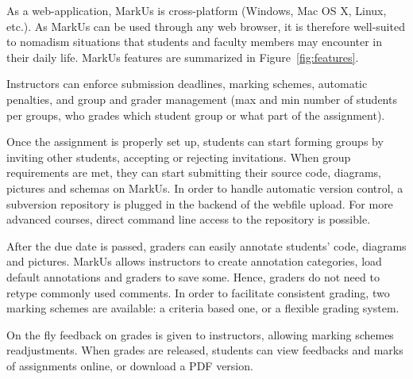 \documentclass[twocolumn,10pt]{asme2e}
\begin{document}
As a web-application, MarkUs is cross-platform (Windows, Mac OS X, Linux,
etc.). As MarkUs can be used through any web browser, it is therefore
well-suited to nomadism situations that students and faculty members may
encounter in their daily life. MarkUs features are summarized in Figure~\ref{fig:features}.

Instructors can enforce submission deadlines, marking schemes, automatic
penalties, and group and grader management (max and min number of students per
groups, who grades which student group or what part of the assignment).

Once the assignment is properly set up, students can start forming groups by
inviting other students, accepting or rejecting invitations. When group
requirements are met, they can start submitting their source code, diagrams,
pictures and schemas on MarkUs. In order to handle automatic version control,
a subversion repository is plugged in the backend of the webfile upload. For
more advanced courses, direct command line access to the repository is
possible.

After the due date is passed, graders can easily annotate students' code,
diagrams and pictures. MarkUs allows instructors to create annotation
categories, load default annotations and graders to save some. Hence, graders
do not need to retype commonly used comments. In order to facilitate
consistent grading, two marking schemes are available: a criteria based one,
or a flexible grading system.

On the fly feedback on grades is given to instructors, allowing marking
schemes readjustments. When grades are released, students can view feedbacks
and marks of assignments online, or download a PDF version.
\end{document}
